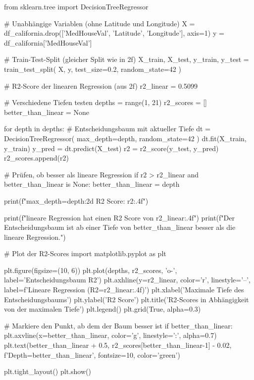 from sklearn.tree import DecisionTreeRegressor

# Unabhängige Variablen (ohne Latitude und Longitude)
X = df_california.drop(['MedHouseVal', 'Latitude', 'Longitude'], axis=1)
y = df_california['MedHouseVal']

# Train-Test-Split (gleicher Split wie in 2f)
X_train, X_test, y_train, y_test = train_test_split(
    X, y, test_size=0.2, random_state=42
)

# R2-Score der linearen Regression (aus 2f)
r2_linear = 0.5099

# Verschiedene Tiefen testen
depths = range(1, 21)
r2_scores = []
better_than_linear = None

for depth in depths:
    # Entscheidungsbaum mit aktueller Tiefe
    dt = DecisionTreeRegressor(
        max_depth=depth,
        random_state=42
    )
    dt.fit(X_train, y_train)
    y_pred = dt.predict(X_test)
    r2 = r2_score(y_test, y_pred)
    r2_scores.append(r2)
    
    # Prüfen, ob besser als lineare Regression
    if r2 > r2_linear and better_than_linear is None:
        better_than_linear = depth
    
    print(f"max_depth={depth:2d}  R2 Score: {r2:.4f}")

print(f"\nDie lineare Regression hat einen R2 Score von {r2_linear:.4f}")
print(f"Der Entscheidungsbaum ist ab einer Tiefe von {better_than_linear} besser als die lineare Regression.")

# Plot der R2-Scores
import matplotlib.pyplot as plt

plt.figure(figsize=(10, 6))
plt.plot(depths, r2_scores, 'o-', label='Entscheidungsbaum R2')
plt.axhline(y=r2_linear, color='r', linestyle='--', label=f'Lineare Regression (R2={r2_linear:.4f})')
plt.xlabel('Maximale Tiefe des Entscheidungsbaums')
plt.ylabel('R2 Score')
plt.title('R2-Scores in Abhängigkeit von der maximalen Tiefe')
plt.legend()
plt.grid(True, alpha=0.3)

# Markiere den Punkt, ab dem der Baum besser ist
if better_than_linear:
    plt.axvline(x=better_than_linear, color='g', linestyle=':', alpha=0.7)
    plt.text(better_than_linear + 0.5, r2_scores[better_than_linear-1] - 0.02, 
             f'Depth={better_than_linear}', fontsize=10, color='green')

plt.tight_layout()
plt.show()